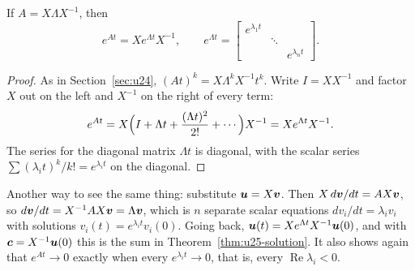 \begin{theorem}\label{thm:u25-diagexp}
If $A=X\Lambda X^{-1}$, then
\[
  e^{At}=Xe^{\Lambda t}X^{-1},\qquad
  e^{\Lambda t}=\begin{bmatrix} e^{\lambda_1t} & & \\ & \ddots & \\ & & e^{\lambda_nt}\end{bmatrix}.
\]
\end{theorem}

\begin{proof}
As in Section~\ref{sec:u24}, $(At)^{k}=X\Lambda^{k}X^{-1}t^{k}$. Write $I=XX^{-1}$ and
factor $X$ out on the left and $X^{-1}$ on the right of every term:
\[
  e^{At}=X\Bigl(I+\Lambda t+\frac{(\Lambda t)^{2}}{2!}+\cdots\Bigr)X^{-1}=Xe^{\Lambda t}X^{-1}.
\]
The series for the diagonal matrix $\Lambda t$ is diagonal, with the scalar series
$\sum(\lambda_it)^{k}/k!=e^{\lambda_it}$ on the diagonal.
\end{proof}

Another way to see the same thing: substitute $\boldsymbol{u}=X\boldsymbol{v}$. Then $X\,d\boldsymbol{v}/dt=AX\boldsymbol{v}$,
so $d\boldsymbol{v}/dt=X^{-1}AX\boldsymbol{v}=\Lambda\boldsymbol{v}$, which is $n$ separate scalar equations
$dv_i/dt=\lambda_iv_i$ with solutions $v_i(t)=e^{\lambda_it}v_i(0)$. Going back,
$\boldsymbol{u}(t)=Xe^{\Lambda t}X^{-1}\boldsymbol{u}(0)$, and with $\boldsymbol{c}=X^{-1}\boldsymbol{u}(0)$ this is the sum
in Theorem~\ref{thm:u25-solution}. It also shows again that $e^{At}\to0$ exactly when every
$e^{\lambda_it}\to0$, that is, every $\operatorname{Re}\lambda_i<0$.

